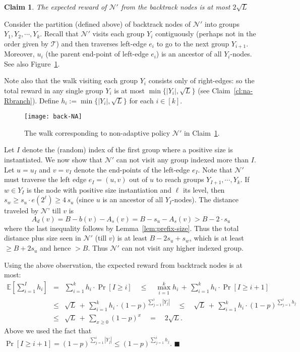 \documentclass[11pt,letterpaper]{article}
\newtheorem{claim}[theorem]{Claim}
\numberwithin{algorithm}{section}
\newenvironment{proof}{

\noindent{\bf Proof:}}
{\hfill$\blacksquare$


}
\newcommand{\N}[0]{{\ensuremath{\mathcal{N}}}\xspace}
\newcommand{\T}{\ensuremath{\mathcal{T}}\xspace}
\newcommand{\E}{\mathbb{E}}
\newcommand{\q}[1]{e\left(#1\right)}
\begin{document}
\begin{claim}\label{cl:na-back}
The expected reward of $\N'$ from the backtrack nodes is at most $2\sqrt{L}$
\end{claim}
\begin{proof}
Consider the partition (defined above) of backtrack nodes of $\N'$ into groups $Y_1,Y_2,\cdots,Y_k$. Recall that $\N'$ visits each group $Y_i$ contiguously (perhaps not in the order given by \T) and then traverses left-edge $e_i$ to go to the next group $Y_{i+1}$. Moreover, $u_i$ (the parent end-point of left-edge $e_i$) is an ancestor of all $Y_i$-nodes. See also Figure~\ref{fig:back-NA}.

Note also that the walk visiting each group $Y_i$ consists only of right-edges: so the total reward in any single group $Y_i$ is at most $\min\{|Y_i|, \sqrt{L}\}$ (see Claim~\ref{cl:na-Rbranch}). Define $h_i:=\min\{|Y_i|, \sqrt{L}\}$ for each $i\in[k]$.

\begin{figure}[ht]
  \begin{centering}
    \texttt{[image: back-NA]}
    \caption{The walk corresponding to non-adaptive policy $\N'$ in Claim~\ref{cl:na-back}. \label{fig:back-NA} }
  \end{centering}
\end{figure}

Let $I$ denote the (random) index of the first group where a positive size is  instantiated. We now show that $\N'$ can not visit any group indexed more than $I$. Let $u=u_I$ and $v=v_I$ denote the end-points of the left-edge $e_I$. Note that $\N'$ must traverse the left edge $e_I=(u,v)$ out of $u$ to reach groups $Y_{I+1},\cdots,Y_k$. If $w\in Y_I$ is the node with positive size instantiation and $\ell$ its level, then $s_w\ge s_u\cdot \q{2^{\ell}}\ge 4\,s_u$ (since $u$ is an ancestor of all $Y_I$-nodes). The distance traveled by \N' till $v$ is $$A_d(v) = B-b(v)-A_s(v) = B - s_u - A_s(v) >B-2\cdot s_u$$
 where the last inequality follows by Lemma~\ref{lem:prefix-size}. Thus the total distance plus size seen in $\N'$ (till $v$) is at least  $B-2s_u+s_w$, which is at least $\ge B+2s_u$ and hence $>B$. Thus $\N'$ can not visit any higher indexed group.

Using the above observation, the expected reward from backtrack nodes is at most:
\begin{eqnarray*}
\E\left[\sum_{i=1}^I h_i\right] & =& \sum_{i=1}^k h_i\cdot \Pr[I\ge i] \quad \le \quad \max_{i=1}^k h_i \,+\, \sum_{i=1}^k h_i\cdot \Pr[I\ge i+1] \\
&\le & \sqrt{L} \,+\, \sum_{i=1}^k h_i\cdot (1-p)^{\sum_{j=1}^{i} |Y_j|} \quad \le \quad \sqrt{L} \,+\, \sum_{i=1}^k h_i\cdot (1-p)^{\sum_{j=1}^{i} h_j} \\
&\le  & \sqrt{L} \,+\, \sum_{x\ge 0} (1-p)^x \quad = \quad 2\sqrt{L}.
\end{eqnarray*}
Above we used the fact that $\Pr[I\ge i+1] = (1-p)^{\sum_{j=1}^i|Y_j|} \le (1-p)^{\sum_{j=1}^i h_j}$.
\end{proof}
\end{document}
